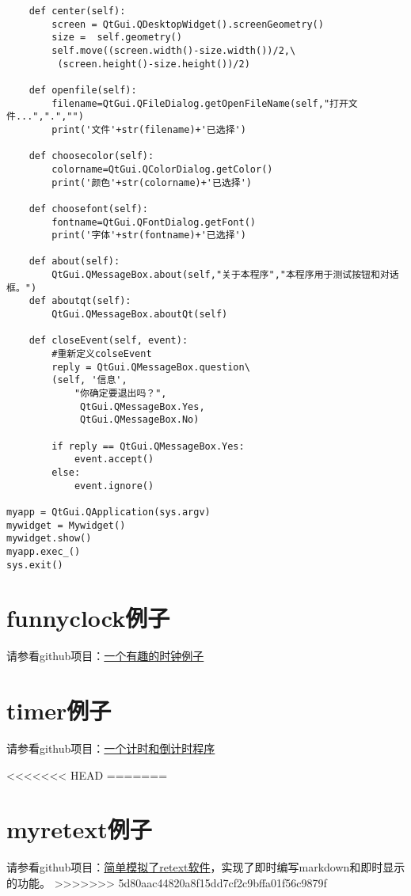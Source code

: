 \documentclass[12pt,oneside]{book}
\begin{document}
\begin{common-format}
\begin{Verbatim}
    def center(self):
        screen = QtGui.QDesktopWidget().screenGeometry()
        size =  self.geometry()
        self.move((screen.width()-size.width())/2,\
         (screen.height()-size.height())/2)

    def openfile(self):
        filename=QtGui.QFileDialog.getOpenFileName(self,"打开文件...",".","")
        print('文件'+str(filename)+'已选择')

    def choosecolor(self):
        colorname=QtGui.QColorDialog.getColor()
        print('颜色'+str(colorname)+'已选择')

    def choosefont(self):
        fontname=QtGui.QFontDialog.getFont()
        print('字体'+str(fontname)+'已选择')

    def about(self):
        QtGui.QMessageBox.about(self,"关于本程序","本程序用于测试按钮和对话框。")
    def aboutqt(self):
        QtGui.QMessageBox.aboutQt(self)

    def closeEvent(self, event):
        #重新定义colseEvent
        reply = QtGui.QMessageBox.question\
        (self, '信息',
            "你确定要退出吗？",
             QtGui.QMessageBox.Yes,
             QtGui.QMessageBox.No)

        if reply == QtGui.QMessageBox.Yes:
            event.accept()
        else:
            event.ignore()

myapp = QtGui.QApplication(sys.argv)
mywidget = Mywidget()
mywidget.show()
myapp.exec_()
sys.exit()
\end{Verbatim}

\section{funnyclock例子}
请参看github项目：\href{https://github.com/a358003542/funnyclock}{一个有趣的时钟例子}


\section{timer例子}
请参看github项目：\href{https://github.com/a358003542/timer}{一个计时和倒计时程序}

<<<<<<< HEAD
=======

\section{myretext例子}
请参看github项目：\href{https://github.com/a358003542/myretext}{简单模拟了retext软件}，实现了即时编写markdown和即时显示的功能。
>>>>>>> 5d80aac44820a8f15dd7cf2c9bffa01f56c9879f




\end{common-format}
\end{document}
